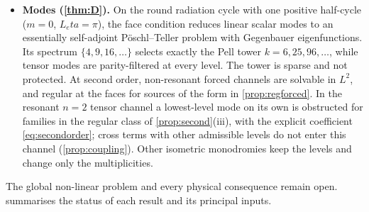 \documentclass[11pt]{article}
\theoremstyle{canonmath}
\theoremstyle{canonpostulate}
\theoremstyle{canonproposition}
\theoremstyle{canonmath}
\theoremstyle{canonproposition}
\def\eta{eta}%
\begin{document}
\begin{itemize}
\item \textbf{Modes (\cref{thm:D}).} On the round radiation cycle with one positive half-cycle ($m=0$, $L_\eta=\pi$), the face condition reduces linear scalar modes to an essentially self-adjoint Pöschl--Teller problem with Gegenbauer eigenfunctions. Its spectrum $\{4,9,16,\dots\}$ selects exactly the Pell tower $k = 6,25,96,\dots$, while tensor modes are parity-filtered at every level. The tower is sparse and not protected. At second order, non-resonant forced channels are solvable in $L^2$, and regular at the faces for sources of the form in \cref{prop:regforced}. In the resonant $n=2$ tensor channel a lowest-level mode on its own is obstructed for families in the regular class of \cref{prop:second}(iii), with the explicit coefficient \eqref{eq:secondorder}; cross terms with other admissible levels do not enter this channel (\cref{prop:coupling}). Other isometric monodromies keep the levels and change only the multiplicities.
\end{itemize}
The global non-linear problem and every physical consequence remain open.  summarises the status of each result and its principal inputs.
\end{document}
